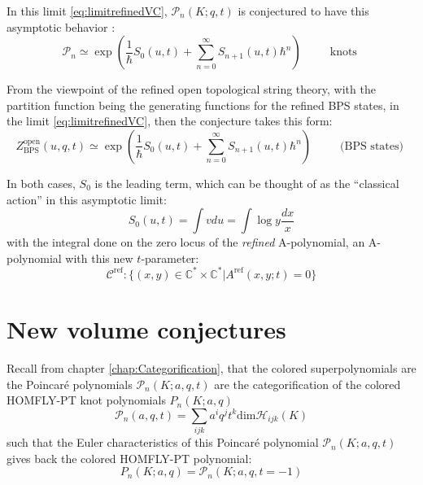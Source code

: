 \documentclass[a4paper,titlepage,twoside]{book}
\begin{document}
In this limit \eqref{eq:limitrefinedVC}, $\mathcal{P}_n{(K;q,t)}$ is conjectured to have this asymptotic behavior  \cite{FujiGukovSulkowski2012}:
\begin{equation}
  \mathcal{P}_n \simeq \exp{ \left( \frac{1}{ \hbar} S_0{ (u,t) } + \sum_{n=0}^{\infty} S_{n+1}{ (u,t) } \hbar^n \right) } \quad \quad \, \text{ knots }  \label{Eq:refinedVolumeConjecture00}
\end{equation}

From the viewpoint of the refined open topological string theory, with the partition function being the generating functions for the refined BPS states, in the limit \eqref{eq:limitrefinedVC}, then the conjecture takes this form\cite{FujiGukovSulkowski2012}:
\begin{equation}
  Z^{\text{open}}_{\text{BPS}}{ (u,q,t)} \simeq \exp{ \left( \frac{1}{ \hbar} S_0{ (u,t)} + \sum_{n=0}^{ \infty} S_{n+1}{ (u,t) } \hbar^n \right) } \quad \quad \, \text{ (BPS states) }
\end{equation}

In both cases, $S_0$ is the leading term, which can be thought of as the ``classical action'' in this asymptotic limit:
\begin{equation}
  S_0{ (u,t)} = \int v du = \int \log{y} \frac{dx}{x}
\end{equation}
with the integral done on the zero locus of the \emph{refined} A-polynomial, an A-polynomial with this new $t$-parameter:
\begin{equation}
  \mathcal{C}^{\text{ref}} : \lbrace (x,y) \in \mathbb{C}^* \times \mathbb{C}^* | A^{\text{ref}}{ (x,y;t) } = 0 \rbrace  \label{eq:refinedA0locus}
\end{equation}


\section{New volume conjectures}

Recall from chapter \ref{chap:Categorification}, that the colored superpolynomials are the Poincar\'{e} polynomials $\mathcal{P}_n{(K;a,q,t)}$ are the categorification of the colored HOMFLY-PT knot polynomials $P_n{(K;a,q)}$
\begin{equation}
  \mathcal{P}_n{(a,q,t)} = \sum_{ijk} a^i q^j t^k \text{dim}{ \mathcal{H}_{ijk}{ (K)} }
\end{equation}
such that the Euler characteristics of this Poincar\'{e} polynomial $\mathcal{P}_n{(K;a,q,t)}$ gives back the colored HOMFLY-PT polynomial:
\begin{equation}
  P_n{(K;a,q)} = \mathcal{P}_n{(K;a,q,t=-1)}
\end{equation}
\end{document}
